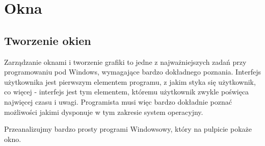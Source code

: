 ﻿\section{Okna}

\subsection{Tworzenie okien}
\label{tworzenieOkienAPI}

Zarządzanie oknami i tworzenie grafiki to jedne z najważniejszych zadań przy programowaniu
pod Windows, wymagające bardzo dokładnego poznania. Interfejs użytkownika jest pierwszym elementem
programu, z jakim styka się użytkownik, co więcej - interfejs jest tym elementem, któremu
użytkownik zwykle poświęca najwięcej czasu i uwagi. Programista musi więc bardzo dokładnie
poznać możliwości jakimi dysponuje w tym zakresie system operacyjny.

Przeanalizujmy bardzo prosty programi Windowsowy, który na pulpicie pokaże okno. 

